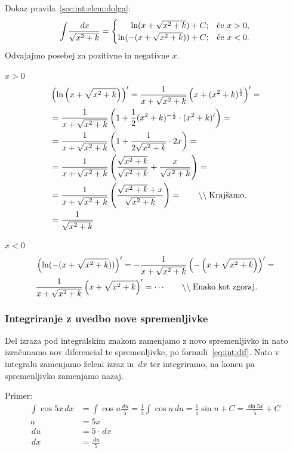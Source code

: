 \documentclass[a4paper,oneside,12pt,fleqn]{article}
\newcommand\krat\cdot
\newcommand{\comment}[1]{\ensuremath{\qquad\backslash\backslash\;}\textnormal{#1}}
\def\kos{\cos}
\renewcommand{\d}{\ensuremath{\,d}} %
\newcommand{\dx}{\ensuremath{\d x}}
\newcommand{\du}{\ensuremath{\d u}}
\numberwithin{equation}{section}
\newenvironment{enumerate*}%
{
\vspace{-12pt}%
\begin{enumerate}%
\setlength{\itemsep}{0pt}%
\setlength{\parskip}{2pt}}%
{\end{enumerate}}
\begin{document}
Dokaz pravila~\eqref{sec:int:elem:dolga}: \\
\[ \int\!\frac{\dx}{\sqrt{x^2+k}} = 
\begin{cases}
  \hfill \ln(x+\sqrt{x^2+k}) + C; & \text{če $x > 0$,} \\
  \hfill \ln(-(x+\sqrt{x^2+k})) + C; & \text{če $x < 0$.}
\end{cases} \]
Odvajajmo posebej za pozitivne in negativne $x$.
\begin{enumerate*}
  \item $x > 0$
    \begin{align*}
      & \left( \ln \left(x + \sqrt{x^2 + k}\right)\right)' = 
          \frac{1}{x + \sqrt{x^2 + k}} \left( x+(x^2+k)^{\frac{1}{2}} \right)' = \\
      & = \frac{1}{x + \sqrt{x^2 + k}} \left( 1 + \frac{1}{2}(x^2 + k)^{-\frac{1}{2}} \krat (x^2 + k)' \right) = \\
      & = \frac{1}{x + \sqrt{x^2 + k}} \left( 1 + \frac{1}{2\sqrt{x^2 + k}}\krat 2x \right) = \\
      & = \frac{1}{x + \sqrt{x^2 + k}} \left( \frac{\sqrt{x^2+k}}{\sqrt{x^2+k}} + \frac{x}{\sqrt{x^2 + k}} \right) = \\
      & = \frac{1}{x + \sqrt{x^2 + k}} \left( \frac{\sqrt{x^2 + k} + x}{\sqrt{x^2+k}} \right) = \comment{Krajšamo.} \\
      & = \frac{1}{\sqrt{x^2 + k}}
    \end{align*}
  \item $x < 0$
    \begin{align*}
      & \left( \ln(-(x+\sqrt{x^2+k}))\right)' = 
      -\frac{1}{x+\sqrt{x^2+k}}\left( -\left( x+\sqrt{x^2+k} \right)\right)' = \\
      & \frac{1}{x+\sqrt{x^2+k}}\left(x+\sqrt{x^2+k} \right)' = \cdots \comment{Enako kot zgoraj.}
    \end{align*}
\end{enumerate*}

\subsubsection{Integriranje z uvedbo nove spremenljivke}
\label{sec:int:subst}
Del izraza pod integralskim znakom zamenjamo z novo spremenljivko in nato izračunamo nov
diferencial te spremenljivke, po formuli~\eqref{eq:int:dif}. Nato v integralu zamenjamo
želeni izraz in $\!\dx$ ter integriramo, na koncu pa spremenljivko zamenjamo nazaj.

Primer:
\begin{align*}
  \int\!\kos5x\dx &= \int\!\kos u\frac{\du}{5} = \frac{1}{5}\!\int\!\kos u \du =
  \frac{1}{5} \sin u + C = \frac{\sin 5x}{5} + C \\
  u &= 5x \\
  \du &= 5\krat \dx \\
  \dx &= \frac{\du}{5} 
\end{align*}
\end{document}
